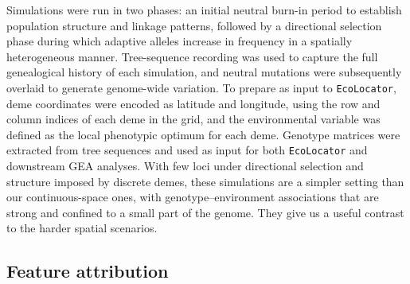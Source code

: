 \documentclass[]{article}
\newcommand{\ecolocator}{\texttt{EcoLocator}\xspace}
\begin{document}
Simulations were run in two phases:
an initial neutral burn-in period
to establish population structure and linkage patterns,
followed by a directional selection phase
during which adaptive alleles increase in frequency
in a spatially heterogeneous manner.
Tree-sequence recording was used to capture
the full genealogical history of each simulation,
and neutral mutations were subsequently overlaid
to generate genome-wide variation.
To prepare as input to \ecolocator, deme coordinates were encoded
as latitude and longitude,
using the row and column indices of each deme in the grid,
and the environmental variable was defined
as the local phenotypic optimum for each deme.
Genotype matrices were extracted from tree sequences
and used as input for both \ecolocator
and downstream GEA analyses.
With few loci under directional selection and structure imposed by discrete demes,
these simulations are a simpler setting than our continuous-space ones,
with genotype--environment associations that are strong
and confined to a small part of the genome.
They give us a useful contrast to the harder spatial scenarios.

\subsection{Feature attribution}
\end{document}
